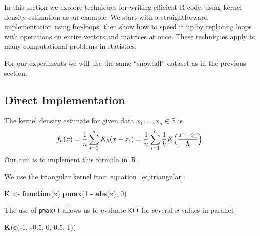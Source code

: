 \documentclass[
  a4paper,
]{article}
\newenvironment{Shaded}{\begin{snugshade}}{\end{snugshade}}
\newcommand{\CommentTok}[1]{\textcolor[rgb]{0.56,0.35,0.01}{\textit{#1}}}
\newcommand{\ControlFlowTok}[1]{\textcolor[rgb]{0.13,0.29,0.53}{\textbf{#1}}}
\newcommand{\DecValTok}[1]{\textcolor[rgb]{0.00,0.00,0.81}{#1}}
\newcommand{\FloatTok}[1]{\textcolor[rgb]{0.00,0.00,0.81}{#1}}
\newcommand{\FunctionTok}[1]{\textcolor[rgb]{0.13,0.29,0.53}{\textbf{#1}}}
\newcommand{\NormalTok}[1]{#1}
\newcommand{\OtherTok}[1]{\textcolor[rgb]{0.56,0.35,0.01}{#1}}
\newcommand{\SpecialCharTok}[1]{\textcolor[rgb]{0.81,0.36,0.00}{\textbf{#1}}}
\newcommand{\StringTok}[1]{\textcolor[rgb]{0.31,0.60,0.02}{#1}}
\theoremstyle{definition}
\theoremstyle{definition}
\theoremstyle{definition}
\theoremstyle{definition}
\theoremstyle{remark}
\begin{document}
In this section we explore techniques for writing efficient R code, using kernel
density estimation as an example. We start with a straightforward implementation
using for-loops, then show how to speed it up by replacing loops with operations
on entire vectors and matrices at once. These techniques apply to many
computational problems in statistics.

For our experiments we will use the same ``snowfall'' dataset as in the
previous section.

\begin{Shaded}
\end{Shaded}

\subsection*{Direct Implementation}\label{direct-implementation}

The kernel density estimate for given data \(x_1, \ldots, x_n \in\mathbb{R}\)
is
\begin{equation*}
  \hat f_h(x)
  = \frac{1}{n} \sum_{i=1}^n K_h(x - x_i)
  = \frac{1}{n} \sum_{i=1}^n \frac{1}{h} K\Bigl( \frac{x - x_i}{h} \Bigr).
\end{equation*}
Our aim is to implement this formula in~R.

We use the triangular kernel from equation~\eqref{eq:triangular}:

\begin{Shaded}
\begin{Highlighting}[]
\NormalTok{K }\OtherTok{\textless{}{-}} \ControlFlowTok{function}\NormalTok{(x) }\FunctionTok{pmax}\NormalTok{(}\DecValTok{1} \SpecialCharTok{{-}} \FunctionTok{abs}\NormalTok{(x), }\DecValTok{0}\NormalTok{)}
\end{Highlighting}
\end{Shaded}

The use of \texttt{pmax()} allows us to evaluate \texttt{K()} for several \(x\)-values in parallel:

\begin{Shaded}
\begin{Highlighting}[]
\FunctionTok{K}\NormalTok{(}\FunctionTok{c}\NormalTok{(}\SpecialCharTok{{-}}\DecValTok{1}\NormalTok{, }\SpecialCharTok{{-}}\FloatTok{0.5}\NormalTok{, }\DecValTok{0}\NormalTok{, }\FloatTok{0.5}\NormalTok{, }\DecValTok{1}\NormalTok{))}
\end{Highlighting}
\end{Shaded}
\end{document}
